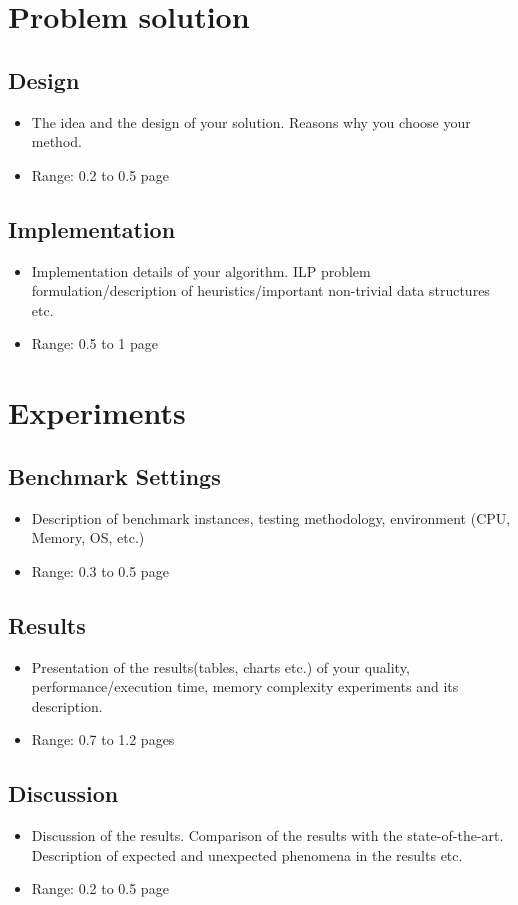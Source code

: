 \documentclass[onecolumn, conference]{IEEEtran}
\newcommand{\range}[2][0]{Range: #1 to #2 page}
\newcommand{\conciseItem}{\itemsep1pt \parskip0pt \parsep0pt}
\begin{document}
\section{Problem solution}
\subsection{Design}
\begin{itemize}
	\conciseItem
	\item The idea and the design of your solution. Reasons why you choose your method.
	\item \range[0.2]{0.5}
\end{itemize}
\subsection{Implementation}
\begin{itemize}
	\conciseItem
	\item Implementation details of your algorithm. ILP problem formulation/description of heuristics/important non-trivial data structures etc.
	\item \range[0.5]{1}
\end{itemize}
\section{Experiments}
\subsection{Benchmark Settings}
\begin{itemize}
	\conciseItem
	\item Description of benchmark instances, testing methodology, environment (CPU, Memory, OS, etc.)
	\item \range[0.3]{0.5}
\end{itemize}
\subsection{Results}
\begin{itemize}
	\conciseItem
	\item Presentation of the results(tables, charts etc.) of your quality, performance/execution time, memory complexity experiments and its description.
	\item \range[0.7]{1.2}s
\end{itemize}
\subsection{Discussion}
\begin{itemize}
	\conciseItem
	\item Discussion of the results. Comparison of the results with the state-of-the-art. Description of expected and unexpected phenomena in the results etc.
	\item \range[0.2]{0.5}
\end{itemize}
\end{document}
